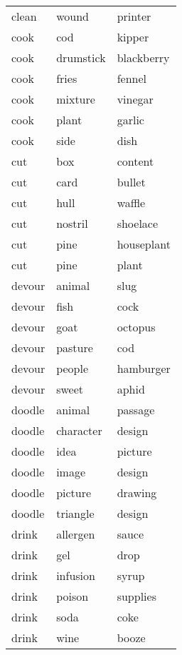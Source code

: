 \begin{longtable}{l|ll}
clean     & wound          & printer      \\
cook      & cod            & kipper       \\
cook      & drumstick      & blackberry   \\
cook      & fries          & fennel       \\
cook      & mixture        & vinegar      \\
cook      & plant          & garlic       \\
cook      & side           & dish         \\
cut       & box            & content      \\
cut       & card           & bullet       \\
cut       & hull           & waffle       \\
cut       & nostril        & shoelace     \\
cut       & pine           & houseplant   \\
cut       & pine           & plant        \\
devour    & animal         & slug         \\
devour    & fish           & cock         \\
devour    & goat           & octopus      \\
devour    & pasture        & cod          \\
devour    & people         & hamburger    \\
devour    & sweet          & aphid        \\
doodle    & animal         & passage      \\
doodle    & character      & design       \\
doodle    & idea           & picture      \\
doodle    & image          & design       \\
doodle    & picture        & drawing      \\
doodle    & triangle       & design       \\
drink     & allergen       & sauce        \\
drink     & gel            & drop         \\
drink     & infusion       & syrup        \\
drink     & poison         & supplies     \\
drink     & soda           & coke         \\
drink     & wine           & booze        \\

\end{longtable}
